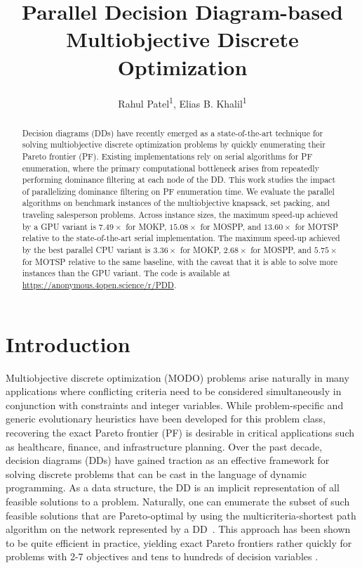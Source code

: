 \documentclass[letterpaper]{article}
\title{Parallel Decision Diagram-based Multiobjective Discrete Optimization} %
\author{
Rahul Patel\textsuperscript{\rm 1},
Elias B. Khalil\textsuperscript{\rm 1}
}
\begin{document}
\maketitle

\begin{abstract}
Decision diagrams (DDs) have recently emerged as a state-of-the-art technique for solving multiobjective discrete optimization problems by quickly enumerating their Pareto frontier (PF). Existing implementations rely on serial algorithms for PF enumeration, where the primary computational bottleneck arises from repeatedly performing dominance filtering at each node of the DD. 
This work studies the impact of parallelizing dominance filtering on PF enumeration time. We evaluate the parallel algorithms on benchmark instances of the multiobjective knapsack, set packing, and traveling salesperson problems. 
Across instance sizes, the maximum speed-up achieved by a GPU variant is $7.49\times$ for MOKP, $15.08\times$ for MOSPP, and $13.60\times$ for MOTSP relative to the state-of-the-art serial implementation. 
The maximum speed-up achieved by the best parallel CPU variant is $3.36\times$ for MOKP, $2.68\times$ for MOSPP, and $5.75\times$ for MOTSP relative to the same baseline, with the caveat that it is able to solve more instances than the GPU variant.
The code is available at \url{https://anonymous.4open.science/r/PDD}.
\end{abstract}


\section{Introduction}
Multiobjective discrete optimization (MODO) \cite{ehrgott2005multicriteria,ehrgott2016exact,miettinen1999nonlinear} problems arise naturally in many applications where conflicting criteria need to be considered simultaneously in conjunction with constraints and integer variables. While problem-specific \cite{Vianna2014AMG} and generic evolutionary heuristics \cite{Deb2002AFA} have been developed for this problem class, recovering the exact Pareto frontier (PF) is desirable in critical applications such as healthcare, finance, and infrastructure planning. Over the past decade, decision diagrams (DDs) \cite{Cir2018DecisionDF} have gained traction as an effective framework for solving discrete problems that can be cast in the language of dynamic programming. As a data structure, the DD is an implicit representation of all feasible solutions to a problem. Naturally, one can enumerate the subset of such feasible solutions that are Pareto-optimal by using the multicriteria-shortest path algorithm on the network represented by a DD~\cite{garroppo2010survey}. This approach has been shown to be quite efficient in practice, yielding exact Pareto frontiers rather quickly for problems with 2-7 objectives and tens to hundreds of decision variables \cite{bergman2022network}.
\end{document}
